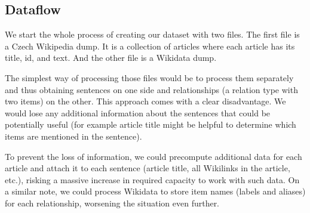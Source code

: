 \subsection{Dataflow}

We start the whole process of creating our dataset with two files. The first file is a Czech Wikipedia dump. It is a collection of articles where each article has its title, id, and text. And the other file is a Wikidata dump. 

The simplest way of processing those files would be to process them separately and thus obtaining sentences on one side and relationships (a relation type with two items) on the other. This approach comes with a clear disadvantage. We would lose any additional information about the sentences that could be potentially useful (for example article title might be helpful to determine which items are mentioned in the sentence). 

To prevent the loss of information, we could precompute additional data for each article and attach it to each sentence (article title, all Wikilinks in the article, etc.), risking a massive increase in required capacity to work with such data. On a similar note, we could process Wikidata to store item names (labels and aliases) for each relationship, worsening the situation even further.

